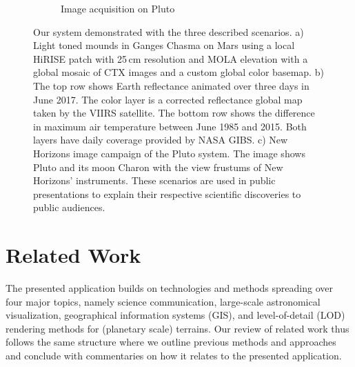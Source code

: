\documentclass[journal]{vgtc}                %
\newcommand{\plgrem}[1]{\textcolor{blue}{~\textbf{!!}~}}
\begin{document}
\begin{figure}
\begin{subfigure}[t]{0.33\linewidth}
      \caption{Image acquisition on Pluto}
    \end{subfigure}
    \caption{Our system demonstrated with the three described scenarios. a) Light toned mounds in Ganges Chasma on Mars using a local HiRISE patch with 25\,cm resolution and MOLA elevation with a global mosaic of CTX images and a custom global color basemap. b) The top row shows Earth reflectance animated over three days in June 2017. The color layer is a corrected reflectance global map taken by the VIIRS satellite. The bottom row shows the difference in maximum air temperature between June 1985 and 2015. Both layers have daily coverage provided by NASA GIBS. c) New Horizons image campaign of the Pluto system. The image shows Pluto and its moon Charon with the view frustums of New Horizons' instruments. These scenarios are used in public presentations to explain their respective scientific discoveries to public audiences.}\vspace{-3mm}
    \label{fig:scenarios}
\end{figure}


\section{Related Work} \label{sec:relatedwork}

%

The presented application builds on technologies and methods spreading over four major topics, namely science communication, large-scale astronomical visualization, geographical information systems (GIS), and level-of-detail (LOD) rendering methods for (planetary scale) terrains. Our review of related work thus follows the same structure where we outline previous methods and approaches and conclude with commentaries on how it relates to the presented application.
\end{document}
